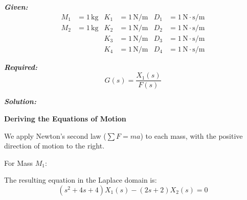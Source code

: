 ﻿\documentclass[11pt]{article}
\begin{document}
\vspace{12pt}

\noindent\textbf{\textit{Given:}}
\[
\begin{aligned}
M_1 &= 1\, \text{kg} & K_1 &= 1\, \text{N/m} & D_1 &= 1\, \text{N}\cdot\text{s/m} \\
M_2 &= 1\, \text{kg} & K_2 &= 1\, \text{N/m} & D_2 &= 1\, \text{N}\cdot\text{s/m} \\
& & K_3 &= 1\, \text{N/m} & D_3 &= 1\, \text{N}\cdot\text{s/m} \\
& & K_4 &= 1\, \text{N/m} & D_4 &= 1\, \text{N}\cdot\text{s/m}
\end{aligned}
\]

\vspace{12pt}

\noindent \textbf{\textit{Required:}}
\[
G(s) = \frac{X_1(s)}{F(s)}
\]

\vspace{12pt}

\noindent \textbf{\textit{Solution:}}

\vspace{12pt}

\noindent \textbf{Deriving the Equations of Motion}
\vspace{12pt}

\noindent We apply Newton's second law ($\sum F = ma$) to each mass, with the positive direction of motion to the right. 

\vspace{12pt}
{For Mass $M_1$:}
\begin{figure}[h!]
\centering
{}
\end{figure}

The resulting equation in the Laplace domain is:
\begin{equation}
(s^2 + 4s + 4)X_1(s) - (2s + 2)X_2(s) = 0 \tag{1}
\end{equation}
\end{document}
